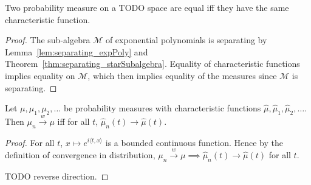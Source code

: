 \begin{lemma}\label{lem:ext_charFun}
Two probability measure on a TODO space are equal iff they have the same characteristic function.
\end{lemma}

\begin{proof}
The sub-algebra $\mathcal M$ of exponential polynomials is separating by Lemma~\ref{lem:separating_expPoly} and Theorem~\ref{thm:separating_starSubalgebra}. Equality of characteristic functions implies equality on $\mathcal M$, which then implies equality of the measures since $\mathcal M$ is separating.
\end{proof}

\begin{theorem}\label{thm:charFun_tendsto_iff_measure_tendsto}
Let $\mu, \mu_1, \mu_2, \ldots$ be probability measures with characteristic functions $\hat{\mu}, \hat{\mu}_1, \hat{\mu}_2, \ldots$. Then $\mu_n \xrightarrow{w} \mu$ iff for all $t$, $\hat{\mu}_n(t) \to \hat{\mu}(t)$.
\end{theorem}

\begin{proof}
For all $t$, $x \mapsto e^{i \langle t, x \rangle}$ is a bounded continuous function. Hence by the definition of convergence in distribution, $\mu_n \xrightarrow{w} \mu \implies \hat{\mu}_n(t) \to \hat{\mu}(t)$ for all $t$.

TODO reverse direction.
\end{proof}